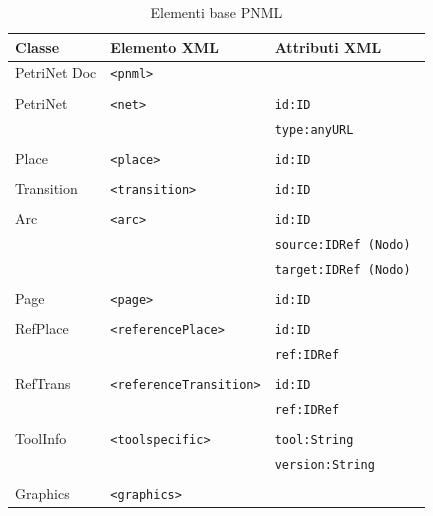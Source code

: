 \documentclass[italian,12pt]{book}
\begin{document}
\begin{table}
  \begin{tabular}{|l|ll|}
    \hline
    Classe          & Elemento XML        & Attributi XML       \\
    \hline
    PetriNet Doc    & \tt{<pnml>}         & \\
    &                     & \\
    PetriNet        & \tt{<net>}          & \tt{id:ID} \\
    &                     & \tt{type:anyURL} \\
    &                     & \\
    Place           & \tt{<place>}        & \tt{id:ID} \\
    &                     & \\
    Transition      & \tt{<transition>}   & \tt{id:ID} \\
    &                     & \\
    Arc             & \tt{<arc>}          & \tt{id:ID} \\
    &                     & \tt{source:IDRef} (Nodo) \\
    &                     & \tt{target:IDRef} (Nodo) \\
    &                     & \\
    Page            & \tt{<page>}         & \tt{id:ID} \\
    &                     & \\
    RefPlace        & \tt{<referencePlace>}& \tt{id:ID} \\
    &                     & \tt{ref:IDRef}  \\
    &                     & \\
    RefTrans        & \tt{<referenceTransition>}& \tt{id:ID} \\
    &                     & \tt{ref:IDRef} \\
    &                     & \\
    ToolInfo        & \tt{<toolspecific>} & \tt{tool:String} \\
    &                     & \tt{version:String} \\
    &                     & \\
    Graphics        & \tt{<graphics>}     & \\
    \hline
  \end{tabular}
  \caption{Elementi base PNML\label{tabella_elementi_base_PNML}}
\end{table}
%
\end{document}
